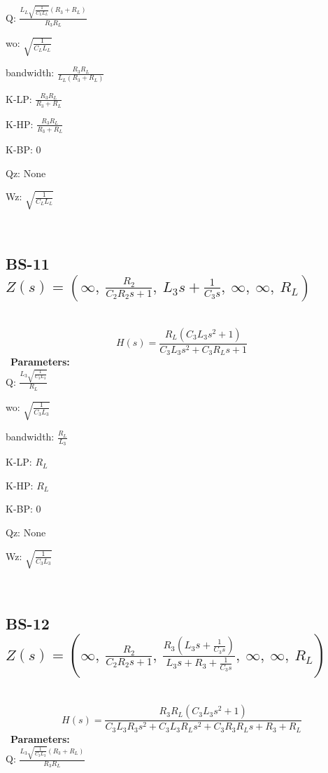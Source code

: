 \documentclass{article}
\begin{document}
Q: $\frac{L_{L} \sqrt{\frac{1}{C_{L} L_{L}}} \left(R_{3} + R_{L}\right)}{R_{3} R_{L}}$\ 

wo: $\sqrt{\frac{1}{C_{L} L_{L}}}$\ 

bandwidth: $\frac{R_{3} R_{L}}{L_{L} \left(R_{3} + R_{L}\right)}$\ 

K-LP: $\frac{R_{3} R_{L}}{R_{3} + R_{L}}$\ 

K-HP: $\frac{R_{3} R_{L}}{R_{3} + R_{L}}$\ 

K-BP: $0$\ 

Qz: $\text{None}$\ 

Wz: $\sqrt{\frac{1}{C_{L} L_{L}}}$\ 

\ 

\subsection{BS-11 $Z(s) = \left( \infty, \  \frac{R_{2}}{C_{2} R_{2} s + 1}, \  L_{3} s + \frac{1}{C_{3} s}, \  \infty, \  \infty, \  R_{L}\right)$ } \ 
\textbf{\[H(s) = \frac{R_{L} \left(C_{3} L_{3} s^{2} + 1\right)}{C_{3} L_{3} s^{2} + C_{3} R_{L} s + 1}\] } \ 
\textbf{Parameters:}\\ 

Q: $\frac{L_{3} \sqrt{\frac{1}{C_{3} L_{3}}}}{R_{L}}$\ 

wo: $\sqrt{\frac{1}{C_{3} L_{3}}}$\ 

bandwidth: $\frac{R_{L}}{L_{3}}$\ 

K-LP: $R_{L}$\ 

K-HP: $R_{L}$\ 

K-BP: $0$\ 

Qz: $\text{None}$\ 

Wz: $\sqrt{\frac{1}{C_{3} L_{3}}}$\ 

\ 

\subsection{BS-12 $Z(s) = \left( \infty, \  \frac{R_{2}}{C_{2} R_{2} s + 1}, \  \frac{R_{3} \left(L_{3} s + \frac{1}{C_{3} s}\right)}{L_{3} s + R_{3} + \frac{1}{C_{3} s}}, \  \infty, \  \infty, \  R_{L}\right)$ } \ 
\textbf{\[H(s) = \frac{R_{3} R_{L} \left(C_{3} L_{3} s^{2} + 1\right)}{C_{3} L_{3} R_{3} s^{2} + C_{3} L_{3} R_{L} s^{2} + C_{3} R_{3} R_{L} s + R_{3} + R_{L}}\] } \ 
\textbf{Parameters:}\\ 

Q: $\frac{L_{3} \sqrt{\frac{1}{C_{3} L_{3}}} \left(R_{3} + R_{L}\right)}{R_{3} R_{L}}$\ 
\end{document}
